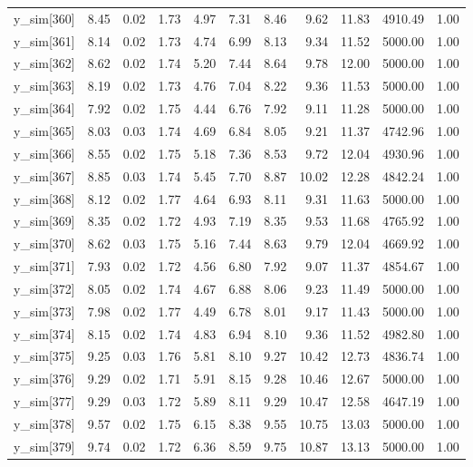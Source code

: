 \begin{table}[ht]
\begin{tabular}{rrrrrrrrrrr}
  y\_sim[360] & 8.45 & 0.02 & 1.73 & 4.97 & 7.31 & 8.46 & 9.62 & 11.83 & 4910.49 & 1.00 \\ 
  y\_sim[361] & 8.14 & 0.02 & 1.73 & 4.74 & 6.99 & 8.13 & 9.34 & 11.52 & 5000.00 & 1.00 \\ 
  y\_sim[362] & 8.62 & 0.02 & 1.74 & 5.20 & 7.44 & 8.64 & 9.78 & 12.00 & 5000.00 & 1.00 \\ 
  y\_sim[363] & 8.19 & 0.02 & 1.73 & 4.76 & 7.04 & 8.22 & 9.36 & 11.53 & 5000.00 & 1.00 \\ 
  y\_sim[364] & 7.92 & 0.02 & 1.75 & 4.44 & 6.76 & 7.92 & 9.11 & 11.28 & 5000.00 & 1.00 \\ 
  y\_sim[365] & 8.03 & 0.03 & 1.74 & 4.69 & 6.84 & 8.05 & 9.21 & 11.37 & 4742.96 & 1.00 \\ 
  y\_sim[366] & 8.55 & 0.02 & 1.75 & 5.18 & 7.36 & 8.53 & 9.72 & 12.04 & 4930.96 & 1.00 \\ 
  y\_sim[367] & 8.85 & 0.03 & 1.74 & 5.45 & 7.70 & 8.87 & 10.02 & 12.28 & 4842.24 & 1.00 \\ 
  y\_sim[368] & 8.12 & 0.02 & 1.77 & 4.64 & 6.93 & 8.11 & 9.31 & 11.63 & 5000.00 & 1.00 \\ 
  y\_sim[369] & 8.35 & 0.02 & 1.72 & 4.93 & 7.19 & 8.35 & 9.53 & 11.68 & 4765.92 & 1.00 \\ 
  y\_sim[370] & 8.62 & 0.03 & 1.75 & 5.16 & 7.44 & 8.63 & 9.79 & 12.04 & 4669.92 & 1.00 \\ 
  y\_sim[371] & 7.93 & 0.02 & 1.72 & 4.56 & 6.80 & 7.92 & 9.07 & 11.37 & 4854.67 & 1.00 \\ 
  y\_sim[372] & 8.05 & 0.02 & 1.74 & 4.67 & 6.88 & 8.06 & 9.23 & 11.49 & 5000.00 & 1.00 \\ 
  y\_sim[373] & 7.98 & 0.02 & 1.77 & 4.49 & 6.78 & 8.01 & 9.17 & 11.43 & 5000.00 & 1.00 \\ 
  y\_sim[374] & 8.15 & 0.02 & 1.74 & 4.83 & 6.94 & 8.10 & 9.36 & 11.52 & 4982.80 & 1.00 \\ 
  y\_sim[375] & 9.25 & 0.03 & 1.76 & 5.81 & 8.10 & 9.27 & 10.42 & 12.73 & 4836.74 & 1.00 \\ 
  y\_sim[376] & 9.29 & 0.02 & 1.71 & 5.91 & 8.15 & 9.28 & 10.46 & 12.67 & 5000.00 & 1.00 \\ 
  y\_sim[377] & 9.29 & 0.03 & 1.72 & 5.89 & 8.11 & 9.29 & 10.47 & 12.58 & 4647.19 & 1.00 \\ 
  y\_sim[378] & 9.57 & 0.02 & 1.75 & 6.15 & 8.38 & 9.55 & 10.75 & 13.03 & 5000.00 & 1.00 \\ 
  y\_sim[379] & 9.74 & 0.02 & 1.72 & 6.36 & 8.59 & 9.75 & 10.87 & 13.13 & 5000.00 & 1.00 \\ 

\end{tabular}
\end{table}
